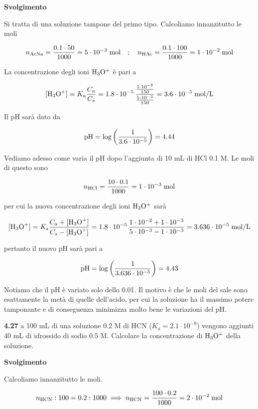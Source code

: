 \vspace{0.2cm}\large\textbf{Svolgimento}\normalsize

Si tratta di una soluzione tampone del primo tipo. Calcoliamo innanzitutto le moli

$$n_{\rm AcNa}=\frac{0.1 \cdot 50}{1000}= 5 \cdot 10^{-3} \; \text{mol}
\quad;\quad
n_{\rm HAc}=\frac{0.1 \cdot 100}{1000}=1 \cdot 10^{-2} \; \rm mol$$

La concentrazione degli ioni $\rm H_3O^+$ è pari a

$$[\text{H}_3\text{O}^+]=K_a\frac{C_a}{C_s}
=1.8 \cdot 10^{-5}\,\frac{\frac{1 \cdot 10^{-2}}{150}}{\frac{5 \cdot 10^{-3}}{150}}=3.6 \cdot 10^{-5} \; \rm mol/L$$

Il pH sarà dato da

$$\rm pH=\log{\left(\frac{1}{3.6 \cdot 10^{-5}}\right)}=4.44$$

Vediamo adesso come varia il pH dopo l'aggiunta di 10 mL di HCl 0.1 M. Le moli di questo sono

$$n_{\rm HCl}=\frac{10 \cdot 0.1}{1000}=1 \cdot 10^{-3} \; \rm mol$$

per cui la nuova concentrazione degli ioni $\rm H_3O^+$ sarà

$${[\text{H}_3\text{O}^+]}=\textit{K}_\textit{a} \frac{C_a + \rm{[\text{H}_3\text{O}^+]}}{C_s - \rm{[\text{H}_3\text{O}^+]}}
=1.8 \cdot 10^{-5} \, \frac{1 \cdot 10^{-2} + 1 \cdot 10^{-3}}{5 \cdot 10^{-3} - 1 \cdot 10^{-3}}
=3.636 \cdot 10^{-5} \; \rm mol/L$$

pertanto il nuovo pH sarà pari a

$$\rm pH=\log{\left(\frac{1}{3.636 \cdot 10^{-5}}\right)}=4.43$$

Notiamo che il pH è variato solo dello 0.01. Il motivo è che le moli del sale sono esattamente la metà di quelle dell'acido, per cui la soluzione ha il massimo potere tamponante e di conseguenza minimizza molto bene le variazioni del pH.

\vspace{0.2cm}\textbf{4.27} a 100 mL di una soluzione 0.2 M di HCN ($K_a=2.1 \cdot 10^{-9}$) vengono aggiunti 40 mL di idrossido di sodio 0.5 M. Calcolare la concentrazione di $\rm H_3O^+$ della soluzione.

\vspace{0.2cm}\large\textbf{Svolgimento}\normalsize

\vspace{0.2cm}Calcoliamo innanzitutto le moli.

$$n_{\rm HCN}:100=0.2:1000
\implies
n_{\rm HCN}=\frac{100 \cdot 0.2}{1000}=2 \cdot 10^{-2} \; \rm mol$$

